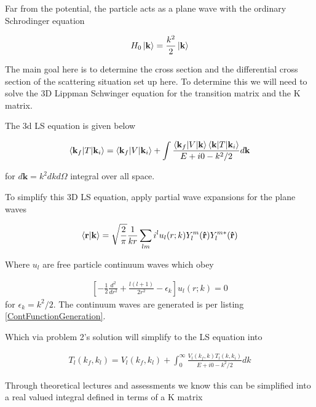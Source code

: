 \documentclass{article}
\renewcommand{\vec}[1]{\mathbf{#1}}
\let\oldhat\hat
\renewcommand{\hat}[1]{\oldhat{\mathbf{#1}}}
\begin{document}
   	Far from the potential, the particle acts as a plane wave with the ordinary Schrodinger equation
   	
   	\begin{gather}
   		H_0\ket{\vec{k}} = \frac{k^2}{2}\ket{\vec{k}}
   	\end{gather}
   	
   	The main goal here is to determine the cross section and the differential cross section of the scattering situation set up here. To determine this we will need to solve the 3D Lippman Schwinger equation for the transition matrix and the K matrix. 
   	
   	The 3d LS equation is given below 
   	
   	\begin{gather}
   		\braket{\vec{k}_f}{T|\vec{k}_i} = \braket{\vec{k}_f}{V|\vec{k}_i} + \int\frac{\braket{\vec{k}_f}{V|\vec{k}}\braket{\vec{k}}{T|\vec{k}_i}}{E + i0 - k^2/2}d\vec{k} 
   	\end{gather}
   	
   	for $d\vec{k} = k^2dkd\Omega$ integral over all space.
   	
   	To simplify this 3D LS equation, apply partial wave expansions for the plane waves
   	
   	\begin{gather}
   		\braket{\vec{r}}{\vec{k}} = \sqrt{\frac{2}{\pi}} \frac{1}{kr} \sum_{lm} i^l u_l(r;k) Y^m_l(\vec{\hat{r}}) Y^{m*}_l(\vec{\hat{r}})
   	\end{gather}
   	
   	Where $u_l$ are free particle continuum waves which obey 
   	
   	\begin{gather}
   		\left[ -\frac{1}{2}\frac{d^2}{dr^2} + \frac{l(l+1)}{2r^2} - \epsilon_k \right]u_l(r;k) = 0
   	\end{gather}
   	for $\epsilon_k = k^2/2$. The continuum waves are generated is per listing \ref{ContFunctionGeneration}. 
   	
   	Which via problem 2's solution will simplify to the LS equation into 
   	
   	\begin{gather}
   		T_l(k_f,k_l) = V_l(k_f,k_l) + \int_{0}^{\infty}\frac{V_l(k_f,k)T_l(k,k_i)}{E + i0 - k^2/2}dk
   	\end{gather}
   	
   	Through theoretical lectures and assessments we know this can be simplified into a real valued integral defined in terms of a K matrix
   	
\end{document}
